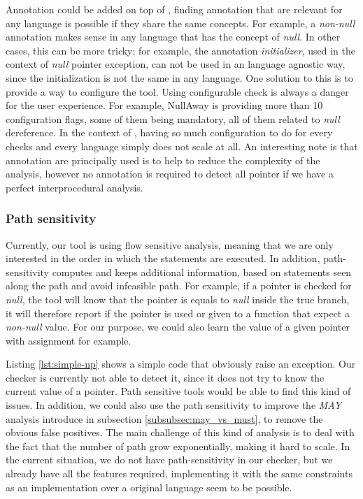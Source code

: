 Annotation could be added on top of \slang{}, finding annotation that are relevant for any language is possible if they share the same concepts. 
For example, a \emph{non-null} annotation makes sense in any language that has the concept of \emph{null}. 
In other cases, this can be more tricky; for example, the annotation \emph{initializer}, used in the context of \emph{null} pointer exception, can not be used in an language agnostic way, since the initialization is not the same in any language.\newline
One solution to this is to provide a way to configure the tool. 
Using configurable check is always a danger for the user experience. For example, NullAway is providing more than 10 configuration flags, some of them being mandatory, all of them related to \emph{null} dereference. 
In the context of \slang{}, having so much configuration to do for every checks and every language simply does not scale at all.\newline
An interesting note is that annotation are principally used is to help to reduce the complexity of the analysis, however no annotation is required to detect all pointer if we have a perfect interprocedural analysis.

\subsubsection{Path sensitivity}
\label{subsubsec:path_sensitivity}

Currently, our tool is using flow sensitive analysis, meaning that we are only interested in the order in which the statements are executed.
In addition, path-sensitivity computes and keeps additional information, based on statements seen along the path and avoid infeasible path. 
For example, if a pointer is checked for \emph{null}, the tool will know that the pointer is equals to \emph{null} inside the true branch, it will therefore report if the pointer is used or given to a function that expect a \emph{non-null} value.
For our purpose, we could also learn the value of a given pointer with assignment for example.



Listing \ref{lst:simple-np} shows a simple code that obviously raise an exception. Our checker is currently not able to detect it, since it does not try to know the current value of a pointer.
Path sensitive tools would be able to find this kind of issues.
In addition, we could also use the path sensitivity to improve the \emph{MAY} analysis introduce in subsection \ref{subsubsec:may_vs_must}, to remove the obvious false positives. 
The main challenge of this kind of analysis is to deal with the fact that the number of path grow exponentially, making it hard to scale. 
In the current situation, we do not have path-sensitivity in our checker, but we already have all the features required, implementing it with the same constraints as an implementation over a original language seem to be possible.

